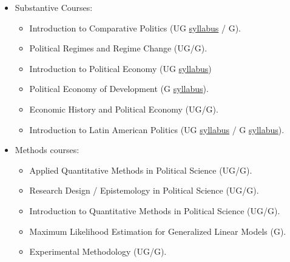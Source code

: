 \documentclass[10pt,stdletter,dateno,sigleft]{newlfm} %
\begin{document}
\begin{newlfm}




{\unskip}



\begin{itemize}
\item Substantive Courses:
	\begin{itemize}
	\item Introduction to Comparative Politics (UG \href{https://github.com/hbahamonde/Comparative_Politics_UGRAD/raw/master/Bahamonde_Comparative_Politics_Syllabus_UGRAD.pdf}{syllabus} / G).
	\item Political Regimes and Regime Change (UG/G).
	\item Introduction to Political Economy (UG \href{https://github.com/hbahamonde/Political-Economy-Intro-UGrad/raw/master/Pol_Econ_Dev_Syllabus_UGRAD.pdf}{syllabus})
	\item Political Economy of Development (G \href{https://github.com/hbahamonde/Pol_Econ_Dev_Grad/raw/master/Pol_Econ_Dev_Syllabus_GRAD.pdf}{syllabus}).
	\item Economic History and Political Economy (UG/G).
	\item Introduction to Latin American Politics (UG \href{https://github.com/hbahamonde/Latin_American_Politics_UGRAD/raw/master/Bahamonde_Latin_American_Politics_Syllabus_UGRAD.pdf}{syllabus} / G \href{https://github.com/hbahamonde/Latin_American_Politics_GRAD/raw/master/Bahamonde_Latin_American_Politics_Syllabus_GRAD.pdf}{syllabus}).
	\end{itemize}
\item Methods courses:
	\begin{itemize}
	\item Applied Quantitative Methods in Political Science (UG/G).
	\item Research Design / Epistemology in Political Science (UG/G).
	\item Introduction to Quantitative Methods in Political Science (UG/G).
	\item Maximum Likelihood Estimation for Generalized Linear Models (G).
	\item Experimental Methodology (UG/G).
	\end{itemize}
\end{itemize}


{\unskip}










\vspace{-10cm}



\end{newlfm}
\end{document}
